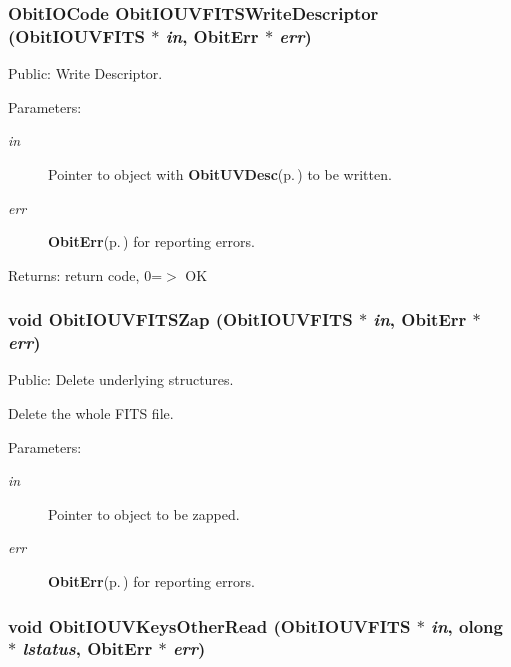 \subsubsection{\setlength{\rightskip}{0pt plus 5cm}Obit\-IOCode Obit\-IOUVFITSWrite\-Descriptor ({\bf Obit\-IOUVFITS} $\ast$ {\em in}, {\bf Obit\-Err} $\ast$ {\em err})}\label{ObitIOUVFITS_8c_a35}


Public: Write Descriptor. 

\begin{Desc}
\item[Parameters:]
\begin{description}
\item[{\em in}]Pointer to object with {\bf Obit\-UVDesc}{\rm (p.\,\pageref{structObitUVDesc})} to be written. \item[{\em err}]{\bf Obit\-Err}{\rm (p.\,\pageref{structObitErr})} for reporting errors. \end{description}
\end{Desc}
\begin{Desc}
\item[Returns:]return code, 0=$>$ OK \end{Desc}
\subsubsection{\setlength{\rightskip}{0pt plus 5cm}void Obit\-IOUVFITSZap ({\bf Obit\-IOUVFITS} $\ast$ {\em in}, {\bf Obit\-Err} $\ast$ {\em err})}\label{ObitIOUVFITS_8c_a22}


Public: Delete underlying structures. 

Delete the whole FITS file. \begin{Desc}
\item[Parameters:]
\begin{description}
\item[{\em in}]Pointer to object to be zapped. \item[{\em err}]{\bf Obit\-Err}{\rm (p.\,\pageref{structObitErr})} for reporting errors. \end{description}
\end{Desc}
\subsubsection{\setlength{\rightskip}{0pt plus 5cm}void Obit\-IOUVKeys\-Other\-Read ({\bf Obit\-IOUVFITS} $\ast$ {\em in}, {\bf olong} $\ast$ {\em lstatus}, {\bf Obit\-Err} $\ast$ {\em err})}\label{ObitIOUVFITS_8c_a14}



